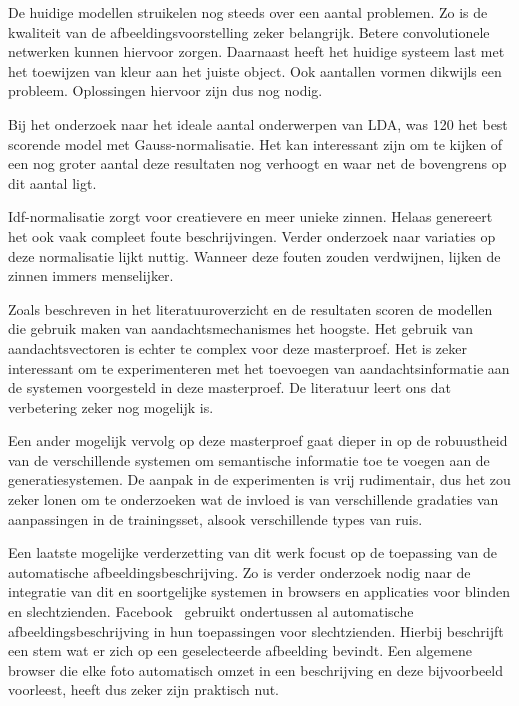 De huidige modellen struikelen nog steeds over een aantal problemen. Zo is de kwaliteit van de afbeeldingsvoorstelling zeker belangrijk. Betere convolutionele netwerken kunnen hiervoor zorgen. Daarnaast heeft het huidige systeem last met het toewijzen van kleur aan het juiste object. Ook aantallen vormen dikwijls een probleem. Oplossingen hiervoor zijn dus nog nodig.

Bij het onderzoek naar het ideale aantal onderwerpen van LDA, was 120 het best scorende model met Gauss-normalisatie. Het kan interessant zijn om te kijken of een nog groter aantal deze resultaten nog verhoogt en waar net de bovengrens op dit aantal ligt.

Idf-normalisatie zorgt voor creatievere en meer unieke zinnen. Helaas genereert het ook vaak compleet foute beschrijvingen. 
Verder onderzoek naar variaties op deze normalisatie lijkt nuttig. Wanneer deze fouten zouden verdwijnen, lijken de zinnen immers menselijker.

Zoals beschreven in het literatuuroverzicht en de resultaten scoren de modellen die gebruik maken van aandachtsmechanismes het hoogste. Het gebruik van aandachtsvectoren is echter te complex voor deze masterproef. Het is zeker interessant om te experimenteren met het toevoegen van aandachtsinformatie aan de systemen voorgesteld in deze masterproef. De literatuur leert ons dat verbetering zeker nog mogelijk is. 

Een ander mogelijk vervolg op deze masterproef gaat dieper in op de robuustheid van de verschillende systemen om semantische informatie toe te voegen aan de generatiesystemen.
De aanpak in de experimenten is vrij rudimentair, dus het zou zeker lonen om te onderzoeken wat de invloed is van verschillende gradaties van aanpassingen in de trainingsset, alsook verschillende types van ruis.

Een laatste mogelijke verderzetting van dit werk focust op de toepassing van de automatische afbeeldingsbeschrijving. 
Zo is verder onderzoek nodig naar de integratie van dit en soortgelijke systemen in browsers en applicaties voor blinden en slechtzienden. Facebook~\cite{facebook} gebruikt ondertussen al automatische afbeeldingsbeschrijving in hun toepassingen voor slechtzienden. Hierbij beschrijft een stem wat er zich op een geselecteerde afbeelding bevindt. Een algemene browser die elke foto automatisch omzet in een beschrijving en deze bijvoorbeeld voorleest, heeft dus zeker zijn praktisch nut.

